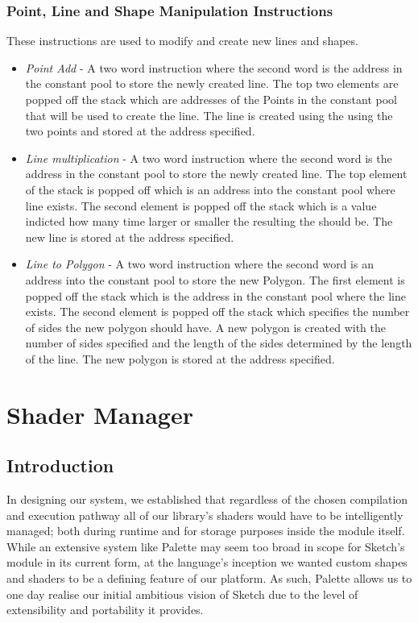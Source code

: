 \documentclass{l3proj}
\begin{document}
\subsubsection{Point, Line and Shape Manipulation Instructions}
These instructions are used to modify and create new lines and shapes.
\begin{itemize}
	\item\textit{Point Add} - A two word instruction where the second word is the address in the constant pool to store the newly created line. The top two elements are popped off the stack which are addresses of the Points in the constant pool that will be used to create the line. The line is created using the using the two points and stored at the address specified.
	\item\textit{Line multiplication} - A two word instruction where the second word is the address in the constant pool to store the newly created line. The top element of the stack is popped off which is an address into the constant pool where line exists. The second element is popped off the stack which is a value indicted how many time larger or smaller the resulting the should be. The new line is stored at the address specified. 
	\item\textit{Line to Polygon} - A two word instruction where the second word is an address into the constant pool to store the new Polygon. The first element is popped off the stack which is the address in the constant pool where the line exists. The second element is popped off the stack which specifies the number of sides the new polygon should have. A new polygon is created with the number of sides specified and the length of the sides determined by the length of the line. The new polygon is stored at the address specified.
\end{itemize}

\section{Shader Manager}
\label{arch-shad}

\subsection{Introduction}
\label{arch-shad-intro}
In designing our system, we established that regardless of the chosen compilation and execution pathway all of our library's shaders would have to be intelligently managed; both during runtime and for storage purposes inside the module itself. While an extensive system like Palette may seem too broad in scope for Sketch's module in its current form, at the language's inception we wanted custom shapes and shaders to be a defining feature of our platform. As such, Palette allows us to one day realise our initial ambitious vision of Sketch due to the level of extensibility and portability it provides.
\end{document}
